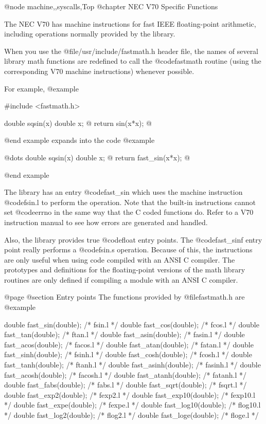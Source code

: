 @node machine,,syscalls,Top
@chapter NEC V70 Specific Functions

The NEC V70 has machine instructions for fast IEEE floating-point
arithmetic, including operations normally provided by the library.  

When you use the @file{/usr/include/fastmath.h} header file, the
names of several library math functions are redefined to call the
@code{fastmath} routine (using the corresponding V70 machine instructions)
whenever possible.

For example,
@example

#include <fastmath.h>

double sqsin(x)
double x;
@{
  return sin(x*x);
@}

@end example
expands into the code
@example

@dots{}
double sqsin(x)
double x;
@{
  return fast_sin(x*x);
@}

@end example

The library has an entry @code{fast_sin} which uses the machine
instruction @code{fsin.l} to perform the operation.  Note that the
built-in instructions cannot set @code{errno}
in the same way that the C coded functions do.  Refer to a V70
instruction manual to see how errors are generated and handled.

Also, the library provides true @code{float} entry points.  The
@code{fast_sinf} entry point really performs a @code{fsin.s}
operation.  Because of this, the instructions are only useful when
using code compiled with an ANSI C compiler.  The prototypes
and definitions for the floating-point versions of the math library
routines are only defined if compiling a module with an ANSI C
compiler.

@page
@section Entry points 
The functions provided by @file{fastmath.h} are
@example

 double fast_sin(double);	/*	fsin.l */
 double fast_cos(double);	/*	fcos.l */
 double fast_tan(double);	/*	ftan.l */
 double fast_asin(double);	/*	fasin.l */
 double fast_acos(double);	/*	facos.l */
 double fast_atan(double);	/*	fatan.l */
 double fast_sinh(double);	/*	fsinh.l */
 double fast_cosh(double);	/*	fcosh.l */
 double fast_tanh(double);	/*	ftanh.l */
 double fast_asinh(double);	/*	fasinh.l */
 double fast_acosh(double);	/*	facosh.l */
 double fast_atanh(double);	/*	fatanh.l */
 double fast_fabs(double);	/*	fabs.l */
 double fast_sqrt(double);	/*	fsqrt.l */
 double fast_exp2(double);	/*	fexp2.l */
 double fast_exp10(double);	/*	fexp10.l */
 double fast_expe(double);	/*	fexpe.l */
 double fast_log10(double);	/*	flog10.l */
 double fast_log2(double);	/*	flog2.l */
 double fast_loge(double);	/*	floge.l */

